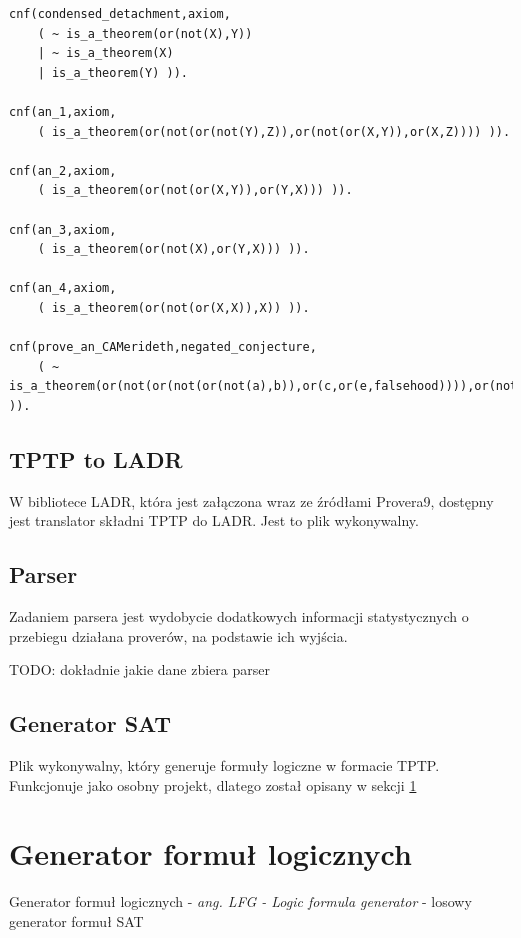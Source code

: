 \documentclass[a4paper,12pt]{article}
\begin{document}
\begin{lstlisting}[caption={Przykład pliku w składni TPTP}]
% File     : LCL001-1 : TPTP v7.2.0. Released v1.0.0.
cnf(condensed_detachment,axiom,
    ( ~ is_a_theorem(or(not(X),Y))
    | ~ is_a_theorem(X)
    | is_a_theorem(Y) )).

cnf(an_1,axiom,
    ( is_a_theorem(or(not(or(not(Y),Z)),or(not(or(X,Y)),or(X,Z)))) )).

cnf(an_2,axiom,
    ( is_a_theorem(or(not(or(X,Y)),or(Y,X))) )).

cnf(an_3,axiom,
    ( is_a_theorem(or(not(X),or(Y,X))) )).

cnf(an_4,axiom,
    ( is_a_theorem(or(not(or(X,X)),X)) )).

cnf(prove_an_CAMerideth,negated_conjecture,
    ( ~ is_a_theorem(or(not(or(not(or(not(a),b)),or(c,or(e,falsehood)))),or(not(or(not(e),a)),or(c,or(falsehood,a))))) )).

\end{lstlisting}


\subsection{TPTP to LADR}

W bibliotece \gls{LADR}, która jest załączona wraz ze źródłami Provera9, dostępny jest translator składni TPTP do LADR. Jest to plik wykonywalny.

\subsection{Parser}

Zadaniem parsera jest wydobycie dodatkowych informacji statystycznych o przebiegu działana proverów, na podstawie ich wyjścia.

TODO: dokładnie jakie dane zbiera parser

\subsection{Generator SAT}

Plik wykonywalny, który generuje formuły logiczne w formacie TPTP. Funkcjonuje jako osobny projekt, dlatego został opisany w sekcji \ref{LFG}

\section{Generator formuł logicznych}\label{LFG}

Generator formuł logicznych - \textit{ang. LFG - Logic formula generator} - losowy generator formuł SAT
\end{document}
